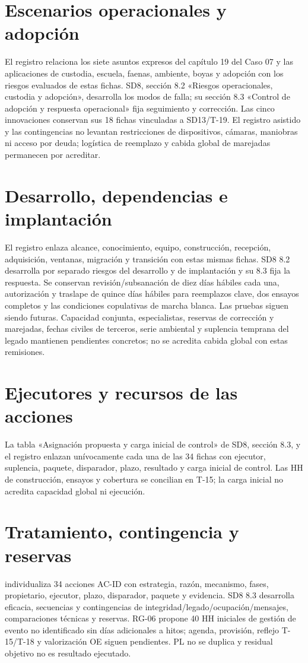 \documentclass[11pt,letterpaper]{report}
\begin{document}
\section{Escenarios operacionales y adopción}
El registro  relaciona los siete asuntos expresos del capítulo 19 del Caso 07 y las aplicaciones de custodia, escuela, faenas, ambiente, boyas y adopción con los riesgos evaluados de estas fichas. SD8, sección 8.2 «Riesgos operacionales, custodia y adopción», desarrolla los modos de falla; su sección 8.3 «Control de adopción y respuesta operacional» fija seguimiento y corrección. Las cinco innovaciones conservan sus 18 fichas vinculadas a SD13/T-19. El registro asistido y las contingencias no levantan restricciones de dispositivos, cámaras, maniobras ni acceso por deuda; logística de reemplazo y cabida global de marejadas permanecen por acreditar.
\section{Desarrollo, dependencias e implantación}
El registro  enlaza alcance, conocimiento, equipo, construcción, recepción, adquisición, ventanas, migración y transición con estas mismas fichas. SD8 8.2 desarrolla por separado riesgos del desarrollo y de implantación y su 8.3 fija la respuesta. Se conservan revisión/subsanación de diez días hábiles cada una, autorización y traslape de quince días hábiles para reemplazos clave, dos ensayos completos y las condiciones copulativas de marcha blanca. Las pruebas siguen siendo futuras. Capacidad conjunta, especialistas, reservas de corrección y marejadas, fechas civiles de terceros, serie ambiental y suplencia temprana del legado mantienen pendientes concretos; no se acredita cabida global con estas remisiones.
\section{Ejecutores y recursos de las acciones}
La tabla «Asignación propuesta y carga inicial de control» de SD8, sección 8.3, y el registro  enlazan unívocamente cada una de las 34 fichas con ejecutor, suplencia, paquete, disparador, plazo, resultado y carga inicial de control. Las HH de construcción, ensayos y cobertura se concilian en T-15; la carga inicial no acredita capacidad global ni ejecución.

\section{Tratamiento, contingencia y reservas}
 individualiza 34 acciones AC-ID con estrategia, razón, mecanismo, fases, propietario, ejecutor, plazo, disparador, paquete y evidencia. SD8 8.3 desarrolla eficacia, secuencias y contingencias de integridad/legado/ocupación/mensajes, comparaciones técnicas y reservas. RG-06 propone 40 HH iniciales de gestión de evento no identificado sin días adicionales a hitos; agenda, provisión, reflejo T-15/T-18 y valorización OE siguen pendientes. PL no se duplica y residual objetivo no es resultado ejecutado.
\end{document}
